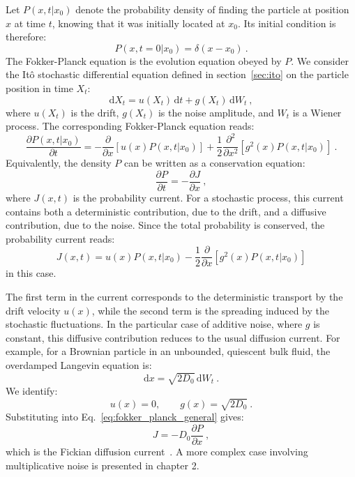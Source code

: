 Let $P(x,t|x_0)$ denote the probability density of finding the particle at position $x$ at time $t$, knowing that it was initially located at $x_0$. Its initial condition is therefore:
\begin{equation}
    P(x,t=0|x_0)=\delta(x-x_0)~.
\end{equation}
The Fokker-Planck equation is the evolution equation obeyed by $P$. We consider the Itô stochastic differential equation defined in section~\ref{sec:ito} on the particle position in time $X_t$:
\begin{equation}
    \mathrm{d}X_t=u(X_t)\,\mathrm{d}t+g(X_t)\,\mathrm{d}W_t~,
    \label{eq:ito_sde_general}
\end{equation}
where $u(X_t)$ is the drift, $g(X_t)$ is the noise amplitude, and $W_t$ is a Wiener process. The corresponding Fokker-Planck equation reads:
\begin{equation}
    \dfrac{\partial P(x,t|x_0)}{\partial t}=-\dfrac{\partial}{\partial x}
    \left[u(x)P(x,t|x_0)\right]+
    \dfrac{1}{2}\dfrac{\partial^2}{\partial x^2}
    \left[g^2(x)P(x,t|x_0) \right]~.
    \label{eq:fokker_planck_general}
\end{equation}
Equivalently, the density $P$ can be written as a conservation equation:
\begin{equation}
\dfrac{\partial P}{\partial t}=-\dfrac{\partial J}{\partial x}~,
\end{equation}
where $J(x,t)$ is the probability current. For a stochastic process, this current contains both a deterministic contribution, due to the drift, and a diffusive contribution, due to the noise. Since the total probability is conserved, the probability current reads:
\begin{equation}
    J(x,t) = u(x)P(x,t|x_0) - \dfrac{1}{2} \dfrac{\partial}{\partial x} \left[ g^2(x)P(x,t|x_0) \right]
\end{equation}
in this case.

The first term in the current corresponds to the deterministic transport by the drift velocity $u(x)$, while the second term is the spreading induced by the stochastic fluctuations. In the particular case of additive noise, where $g$ is constant, this diffusive contribution reduces to the usual diffusion current. For example, for a Brownian particle in an unbounded, quiescent bulk fluid, the overdamped Langevin equation is:
\begin{equation}
    \mathrm{d}x=\sqrt{2D_0}\,\mathrm{d}W_t~.
    \label{Eq.:ODLangevin}
\end{equation}
We identify:
\begin{equation}
    u(x)=0, \qquad g(x)=\sqrt{2D_0}~.
\end{equation}
Substituting into Eq.~\eqref{eq:fokker_planck_general} gives:
\begin{equation}
    J = -D_0 \dfrac{\partial P}{\partial x}~,
    \label{eq:bulk_diffusion_equation}
\end{equation}
which is the Fickian diffusion current~\cite{Fick1855}. A more complex case involving multiplicative noise is presented in chapter 2.

